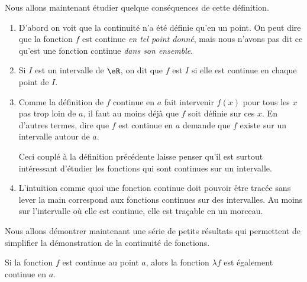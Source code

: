Nous allons maintenant étudier quelque conséquences de cette définition. 

\begin{enumerate}
\item D'abord on voit que la continuité n'a été définie qu'en un point. On peut dire que la fonction $f$ est continue \emph{en tel point donné}, mais nous n'avons pas dit ce qu'est une fonction continue \emph{dans son ensemble}.

\item Si $I$ est un intervalle de $\eR$, on dit que $f$ est  $I$ si elle est continue en chaque point de $I$.

\item Comme la définition de $f$ continue en $a$ fait intervenir $f(x)$ pour tous les $x$ pas trop loin de $a$, il faut au moins déjà que $f$ soit définie sur ces $x$. En d'autres termes, dire que $f$ est continue en $a$ demande que $f$ existe sur un intervalle autour de $a$. 

Ceci couplé à la définition précédente laisse penser qu'il est surtout intéressant d'étudier les fonctions qui sont continues sur un intervalle.

\item L'intuition comme quoi une fonction continue doit pouvoir être tracée sans lever la main correspond aux fonctions continues sur des intervalles. Au moins sur l'intervalle où elle est continue, elle est traçable en un morceau.
\end{enumerate}


Nous allons démontrer maintenant une série de petits résultats qui permettent de simplifier la démonstration de la continuité de fonctions.
\begin{theorem}
Si la fonction $f$ est continue au point $a$, alors la fonction $\lambda f$ est également continue en $a$.
\end{theorem}

